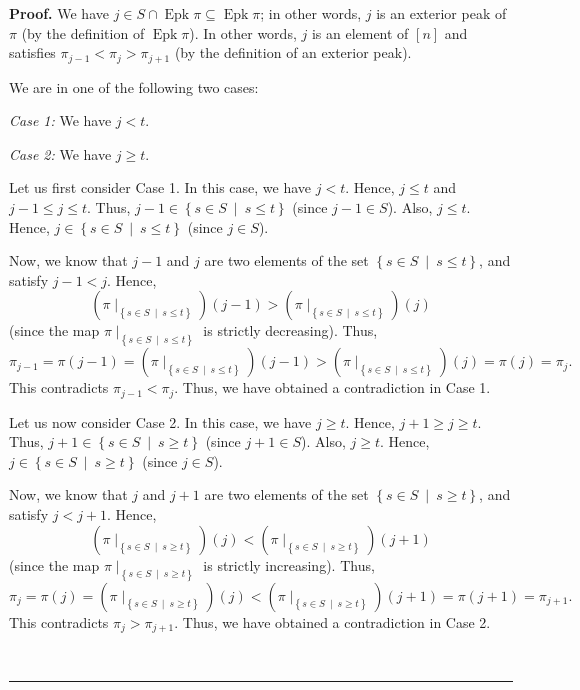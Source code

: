 \documentclass[numbers=enddot,12pt,final,onecolumn,notitlepage]{scrartcl}%
\theoremstyle{definition}
\newenvironment{proof}[1][Proof]{\noindent\textbf{#1.} }{\ \rule{0.5em}{0.5em}}
\newenvironment{verlong}{}{}
\begin{document}
\begin{verlong}
\begin{proof}
We have $j\in S\cap\operatorname{Epk}\pi\subseteq\operatorname{Epk}\pi$; in
other words, $j$ is an exterior peak of $\pi$ (by the definition of
$\operatorname{Epk}\pi$). In other words, $j$ is an element of $\left[
n\right]  $ and satisfies $\pi_{j-1}<\pi_{j}>\pi_{j+1}$ (by the definition of
an exterior peak).

We are in one of the following two cases:

\textit{Case 1:} We have $j<t$.

\textit{Case 2:} We have $j\geq t$.

Let us first consider Case 1. In this case, we have $j<t$. Hence, $j\leq t$
and $j-1\leq j\leq t$. Thus, $j-1\in\left\{  s\in S\ \mid\ s\leq t\right\}  $
(since $j-1\in S$). Also, $j\leq t$. Hence, $j\in\left\{  s\in S\ \mid\ s\leq
t\right\}  $ (since $j\in S$).

Now, we know that $j-1$ and $j$ are two elements of the set $\left\{  s\in
S\ \mid\ s\leq t\right\}  $, and satisfy $j-1<j$. Hence,
\[
\left(  \pi\mid_{\left\{  s\in S\ \mid\ s\leq t\right\}  }\right)  \left(
j-1\right)  >\left(  \pi\mid_{\left\{  s\in S\ \mid\ s\leq t\right\}
}\right)  \left(  j\right)
\]
(since the map $\pi\mid_{\left\{  s\in S\ \mid\ s\leq t\right\}  }$ is
strictly decreasing). Thus,%
\[
\pi_{j-1}=\pi\left(  j-1\right)  =\left(  \pi\mid_{\left\{  s\in
S\ \mid\ s\leq t\right\}  }\right)  \left(  j-1\right)  >\left(  \pi
\mid_{\left\{  s\in S\ \mid\ s\leq t\right\}  }\right)  \left(  j\right)
=\pi\left(  j\right)  =\pi_{j}.
\]
This contradicts $\pi_{j-1}<\pi_{j}$. Thus, we have obtained a contradiction
in Case 1.

Let us now consider Case 2. In this case, we have $j\geq t$. Hence, $j+1\geq
j\geq t$. Thus, $j+1\in\left\{  s\in S\ \mid\ s\geq t\right\}  $ (since
$j+1\in S$). Also, $j\geq t$. Hence, $j\in\left\{  s\in S\ \mid\ s\geq
t\right\}  $ (since $j\in S$).

Now, we know that $j$ and $j+1$ are two elements of the set $\left\{  s\in
S\ \mid\ s\geq t\right\}  $, and satisfy $j<j+1$. Hence,
\[
\left(  \pi\mid_{\left\{  s\in S\ \mid\ s\geq t\right\}  }\right)  \left(
j\right)  <\left(  \pi\mid_{\left\{  s\in S\ \mid\ s\geq t\right\}  }\right)
\left(  j+1\right)
\]
(since the map $\pi\mid_{\left\{  s\in S\ \mid\ s\geq t\right\}  }$ is
strictly increasing). Thus,%
\[
\pi_{j}=\pi\left(  j\right)  =\left(  \pi\mid_{\left\{  s\in S\ \mid\ s\geq
t\right\}  }\right)  \left(  j\right)  <\left(  \pi\mid_{\left\{  s\in
S\ \mid\ s\geq t\right\}  }\right)  \left(  j+1\right)  =\pi\left(
j+1\right)  =\pi_{j+1}.
\]
This contradicts $\pi_{j}>\pi_{j+1}$. Thus, we have obtained a contradiction
in Case 2.


\end{proof}
\end{verlong}
\end{document}
